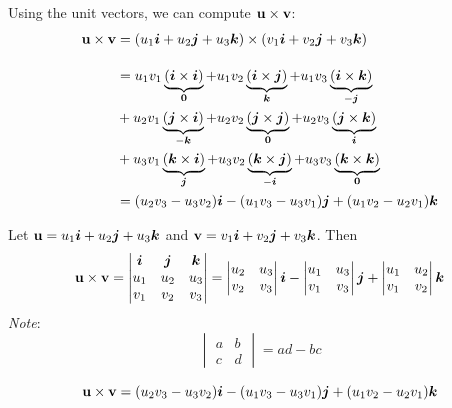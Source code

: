 \documentclass[mathNotesPreamble]{subfiles}
\begin{document}
  \noindent
  Using the unit vectors, we can compute ${\mathbf{u}}\times{\mathbf{v}}$:
  \begin{align*}
    {\mathbf{u}}\times{\mathbf{v}}&= {\left(u_1{\bm{i}}+u_2{\bm{j}}+u_3{\bm{k}}\right)}\times{\left(v_1{\bm{i}}+v_2{\bm{j}}+v_3{\bm{k}}\right)}\\[0.75\baselineskip]
      &=u_1v_1\underbrace{{\left({\bm{i}}\times{\bm{i}}\right)}}_{\mathbf{0}}
       +u_1v_2\underbrace{{\left({\bm{i}}\times{\bm{j}}\right)}}_{{\bm{k}}}
       +u_1v_3\underbrace{{\left({\bm{i}}\times{\bm{k}}\right)}}_{-{\bm{j}}}\\
      &+u_2v_1\underbrace{{\left({\bm{j}}\times{\bm{i}}\right)}}_{-{\bm{k}}}
       +u_2v_2\underbrace{{\left({\bm{j}}\times{\bm{j}}\right)}}_{\mathbf{0}}
       +u_2v_3\underbrace{{\left({\bm{j}}\times{\bm{k}}\right)}}_{{\bm{i}}}\\
      &+u_3v_1\underbrace{{\left({\bm{k}}\times{\bm{i}}\right)}}_{{\bm{j}}}
       +u_3v_2\underbrace{{\left({\bm{k}}\times{\bm{j}}\right)}}_{-{\bm{i}}}
       +u_3v_3\underbrace{{\left({\bm{k}}\times{\bm{k}}\right)}}_{\mathbf{0}}\\
      &={\left(u_2v_3-u_3v_2\right)}{\bm{i}}
       -{\left(u_1v_3-u_3v_1\right)}{\bm{j}}
       +{\left(u_1v_2-u_2v_1\right)}{\bm{k}}
  \end{align*}
  \pagebreak

  \begin{thmBox*}
    Let ${\mathbf{u}}=u_1{\bm{i}}+u_2{\bm{j}}+u_3{\bm{k}}$ and ${\mathbf{v}}=v_1{\bm{i}}+v_2{\bm{j}}+v_3{\bm{k}}$. Then
    \[{\mathbf{u}}\times{\mathbf{v}}=
      \begin{vmatrix}
        {\bm{i}}& {\bm{j}}& {\bm{k}}\\
        u_1& u_2& u_3\\
        v_1& v_2& v_3
      \end{vmatrix}
      =\begin{vmatrix}
        u_2& u_3\\
        v_2& v_3
      \end{vmatrix}{\bm{i}}
      -\begin{vmatrix}
        u_1& u_3\\
        v_1& v_3
      \end{vmatrix}{\bm{j}}
      +\begin{vmatrix}
        u_1& u_2\\
        v_1& v_2
      \end{vmatrix}{\bm{k}}
    \]
    \textit{Note}:
      \[
      \begin{vmatrix}
        a&b\\c&d
      \end{vmatrix}
      =ad-bc
      \]
  \end{thmBox*}

  \[{\mathbf{u}}\times{\mathbf{v}}={\left(u_2v_3-u_3v_2\right)}{\bm{i}}
       -{\left(u_1v_3-u_3v_1\right)}{\bm{j}}
       +{\left(u_1v_2-u_2v_1\right)}{\bm{k}}\]
  
\end{document}
